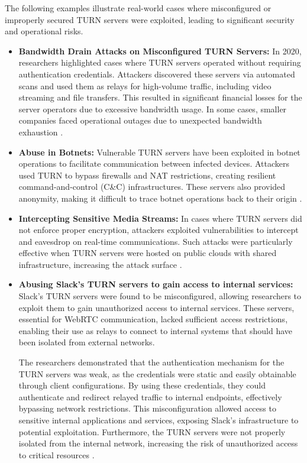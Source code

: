 \documentclass[conference]{IEEEtran}
\begin{document}
The following examples illustrate real-world cases where misconfigured or improperly secured TURN servers were exploited, 
leading to significant security and operational risks.
\begin{itemize}
    \item \textbf{Bandwidth Drain Attacks on Misconfigured TURN Servers:}  
    In 2020, researchers highlighted cases where TURN servers operated without requiring authentication credentials. Attackers discovered 
    these servers via automated scans and used them as relays for high-volume traffic, including video streaming and file transfers. This resulted 
    in significant financial losses for the server operators due to excessive bandwidth usage. In some cases, smaller companies faced operational 
    outages due to unexpected bandwidth exhaustion \cite{abusing_misconfigured_turn_servers}.
    \item \textbf{Abuse in Botnets:}  
    Vulnerable TURN servers have been exploited in botnet operations to facilitate communication between infected devices. Attackers used 
    TURN to bypass firewalls and NAT restrictions, creating resilient command-and-control (C\&C) infrastructures. These servers also provided
     anonymity, making it difficult to trace botnet operations back to their origin \cite{Security_Mechanisms_for_Signaling}.

    \item \textbf{Intercepting Sensitive Media Streams:}  
    In cases where TURN servers did not enforce proper encryption, attackers exploited vulnerabilities to intercept and eavesdrop on real-time 
    communications. Such attacks were particularly effective when TURN servers were hosted on public clouds with shared infrastructure, increasing
    the attack surface \cite{WebRTC_Security}.

    \item \textbf{Abusing Slack's TURN servers to gain access to internal services:} 
    Slack's TURN servers were found to be misconfigured, allowing researchers to exploit them to gain unauthorized access to internal services. 
    These servers, essential for WebRTC communication, lacked sufficient access restrictions, enabling their use as relays to connect to internal systems 
    that should have been isolated from external networks\cite{abusing_misconfigured_turn_servers}.

    The researchers demonstrated that the authentication mechanism for the TURN servers was weak, as the credentials were static and easily 
    obtainable through client configurations. By using these credentials, they could authenticate and redirect relayed traffic to internal endpoints, 
    effectively bypassing network restrictions. This misconfiguration allowed access to sensitive internal applications and services, exposing Slack's 
    infrastructure to potential exploitation. Furthermore, the TURN servers were not properly isolated from the internal network, increasing the risk of 
    unauthorized access to critical resources \cite{abusing_misconfigured_turn_servers}.
\end{itemize}
\end{document}

